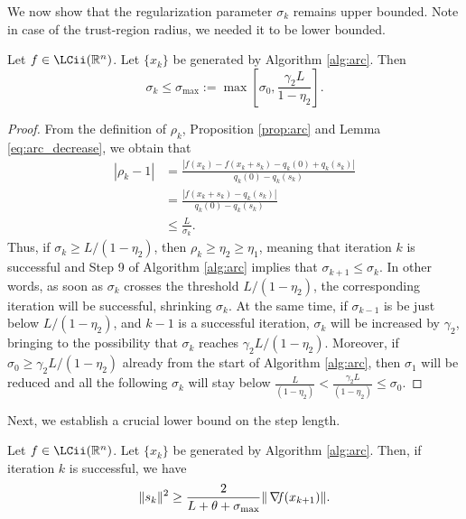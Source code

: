 \documentclass[10pt,a4paper]{article}
\begin{document}
\noindent We now show that the regularization parameter $\sigma_k$ remains upper bounded. Note in case of the trust-region radius, we needed it to be lower bounded.

\begin{lemma}
	Let $f\in \LCii(\Rn)$. Let $\{x_k\}$ be generated by Algorithm \ref{alg:arc}. Then
	\begin{equation*}
		\sigma_k \leq \sigma_{\max} :=\max \left[ \sigma_0, \frac{\gamma_2 L}{1 - \eta_2} \right].
	\end{equation*}
\end{lemma}
\begin{proof}
	From the definition of $\rho_k$, Proposition \ref{prop:arc} and Lemma \ref{eq:arc_decrease}, we obtain that
	\begin{align*}
		|\rho_k - 1| &= \frac{|f(x_k) - f(x_k + s_k) - q_k(0) + q_k(s_k)|}{q_k(0) - q_k(s_k)} \\
		&= \frac{|f(x_k + s_k) - q_k(s_k)|}{q_k(0) - q_k(s_k)} \\
		&\leq \frac{L}{\sigma_k}.
	\end{align*}
	Thus, if $\sigma_k \geq L/(1 - \eta_2)$, then $\rho_k \geq \eta_2\geq\eta_1$, meaning that iteration $k$ is successful and Step 9 of Algorithm \ref{alg:arc} implies that $\sigma_{k+1} \leq \sigma_k$. In other words, as soon as $\sigma_k$ crosses the threshold $L/(1 - \eta_2)$, the corresponding iteration will be successful, shrinking $\sigma_k$. At the same time, if $\sigma_{k-1}$ is be just below $L/(1 - \eta_2)$, and $k-1$ is a successful iteration, $\sigma_k$ will be increased by $\gamma_2$, bringing to the possibility that $\sigma_k$ reaches $\gamma_2L/(1 - \eta_2)$. Moreover, if $\sigma_0\geq \gamma_2L/(1 - \eta_2)$ already from the start of Algorithm \ref{alg:arc}, then $\sigma_1$ will be reduced and all the following $\sigma_k$ will stay below $\frac{L}{(1 - \eta_2)}<\frac{\gamma_2L}{(1 - \eta_2)}\leq \sigma_0$. 	 
\end{proof}

\noindent Next, we establish a crucial lower bound on the step length.

\begin{lemma}
	Let $f\in \LCii(\Rn)$. Let $\{x_k\}$ be generated by Algorithm \ref{alg:arc}. Then, if iteration $k$ is successful, we have
	\begin{equation*}
		\|s_k\|^2 \geq \frac{2}{L + \theta + \sigma_{\max}} \|\operatorname*{\mathit{\nabla \!f}}(x_{k+1})\|.
	\end{equation*}
\end{lemma}



\end{document}
